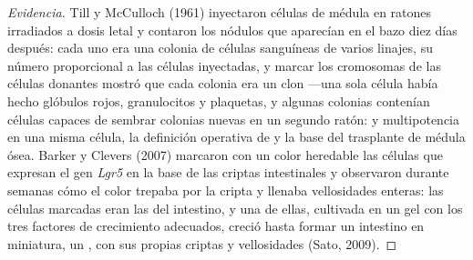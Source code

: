 \begin{proof}[Evidencia]
Till y McCulloch (1961) inyectaron células de médula en ratones
irradiados a dosis letal y contaron los nódulos que aparecían en el
bazo diez días después: cada uno era una colonia de células sanguíneas
de varios linajes, su número proporcional a las células inyectadas, y
marcar los cromosomas de las células donantes mostró que cada colonia
era un clon ---una sola célula había hecho glóbulos rojos, granulocitos
y plaquetas, y algunas colonias contenían células capaces de sembrar
colonias nuevas en un segundo ratón:  y multipotencia en
una misma célula, la definición operativa de  y la base del
trasplante de médula ósea. Barker y Clevers (2007) marcaron con un
color heredable las células que expresan el gen \emph{Lgr5} en la base
de las criptas intestinales y observaron durante semanas cómo el color
trepaba por la cripta y llenaba vellosidades enteras: las células
marcadas eran las  del intestino, y una de ellas,
cultivada en un gel con los tres factores de crecimiento adecuados,
creció hasta formar un intestino en miniatura, un \emph{}, con
sus propias criptas y vellosidades (Sato, 2009).
\end{proof}

